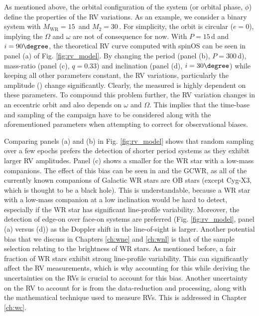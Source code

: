 As mentioned above, the orbital configuration of the system (or orbital phase, $\phi$) define the properties of the RV variations. As an example, we consider a binary system with $M_{\textrm{WR}} = 15\,$\Msun{} and $M_2 = 30\,$\Msun{}. For simplicity, the orbit is circular ($e=0$), implying the $\Omega$ and $\omega$ are not of consequence for now. With $P=15\,$d and $i=90\degree$, the theoretical RV curve computed with spinOS \citep{2021Fabry} can be seen in panel (a) of Fig. \ref{fig:rv_model}. By changing the period (panel (b), $P=300\,$d), mass-ratio (panel (c), $q=0.33$) and inclination (panel (d), $i=30\degree$) while keeping all other parameters constant, the RV variations, particularly the amplitude (\DelRV{}) change significantly. Clearly, the measured \DelRV{} is highly dependent on these parameters. To compound this problem further, the RV variation changes in an eccentric orbit and also depends on $\omega$ and $\Omega$. This implies that the time-base and sampling of the campaign have to be considered along with the aforementioned parameters when attempting to correct for observational biases.

Comparing panels (a) and (b) in Fig. \ref{fig:rv_model} shows that random sampling over a few epochs prefers the detection of shorter period systems as they exhibit larger RV amplitudes. Panel (c) shows a smaller \DelRV{} for the WR star with a low-mass companions. The effect of this bias can be seen in  and the GCWR, as all of the currently known companions of Galactic WR stars are OB stars (except Cyg-X3, which is thought to be a black hole). This is understandable, because a WR star with a low-mass companion at a low inclination would be hard to detect, especially if the WR star has significant line-profile variability. Moreover, the detection of edge-on over face-on systems are preferred (Fig. \ref{fig:rv_model}, panel (a) versus (d)) as the Doppler shift in the line-of-sight is larger. Another potential bias that we discuss in Chapters \ref{ch:wne} and \ref{ch:wnl} is that of the sample selection relating to the brightness of WR stars. As mentioned before, a fair fraction of WR stars exhibit strong line-profile variability. This can significantly affect the RV measurements, which is why accounting for this while deriving the uncertainties on the RVs is crucial to account for this bias. Another uncertainty on the RV to account for is from the data-reduction and processing, along with the mathematical technique used to measure RVs. This is addressed in Chapter \ref{ch:wc}.

